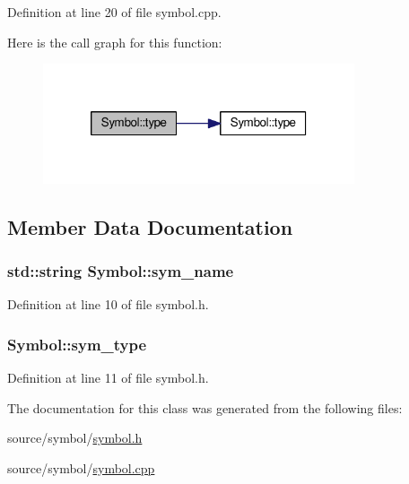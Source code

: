 Definition at line 20 of file symbol.\-cpp.



Here is the call graph for this function\-:
\nopagebreak
\begin{figure}[H]
\begin{center}
\leavevmode
\includegraphics[width=260pt]{class_symbol_a7822b485af2e735d462276836479ff24_cgraph}
\end{center}
\end{figure}




\subsection{Member Data Documentation}
\hypertarget{class_symbol_a131f02876f25c9bdccbd71e1e7147989}{
\subsubsection[{sym\-\_\-name}]{\setlength{\rightskip}{0pt plus 5cm}std\-::string Symbol\-::sym\-\_\-name\hspace{0.3cm}{\ttfamily [protected]}}}\label{class_symbol_a131f02876f25c9bdccbd71e1e7147989}


Definition at line 10 of file symbol.\-h.

\hypertarget{class_symbol_a4cb69009155bb4a73a86fc4004655a31}{
\subsubsection[{sym\-\_\-type}]{ Symbol\-::sym\-\_\-type\hspace{0.3cm}{\ttfamily [protected]}}}\label{class_symbol_a4cb69009155bb4a73a86fc4004655a31}


Definition at line 11 of file symbol.\-h.



The documentation for this class was generated from the following files\-:\begin{DoxyCompactItemize}
\item 
source/symbol/\hyperlink{symbol_8h}{symbol.\-h}\item 
source/symbol/\hyperlink{symbol_8cpp}{symbol.\-cpp}\end{DoxyCompactItemize}

